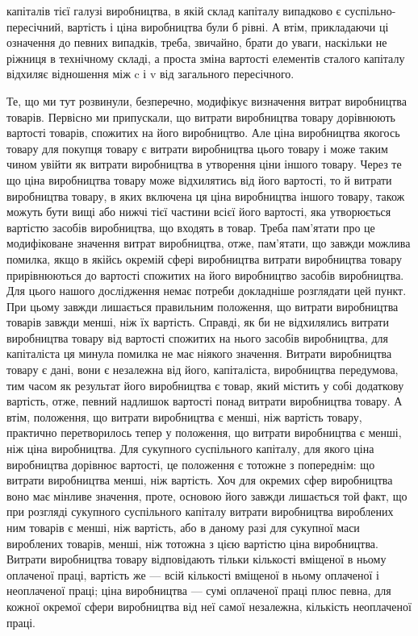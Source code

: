 капіталів тієї галузі виробництва, в якій склад капіталу випадково є суспільно-пересічний, вартість
і ціна виробництва були б
рівні. А втім, прикладаючи ці означення до певних випадків,
треба, звичайно, брати до уваги, наскільки не ріжниця в технічному складі, а проста зміна вартості
елементів сталого капіталу
відхиляє відношення між c і v від загального пересічного.

Те, що ми тут розвинули, безперечно, модифікує визначення
витрат виробництва товарів. Первісно ми припускали, що витрати виробництва товару дорівнюють
вартості товарів, спожитих на його виробництво. Але ціна виробництва якогось товару для покупця
товару є витрати виробництва цього товару
і може таким чином увійти як витрати виробництва в утворення
ціни іншого товару. Через те що ціна виробництва товару може
відхилятись від його вартості, то й витрати виробництва товару,
в яких включена ця ціна виробництва іншого товару, також
можуть бути вищі або нижчі тієї частини всієї його вартості,
яка утворюється вартістю засобів виробництва, що входять в
товар. Треба пам’ятати про це модифіковане значення витрат
виробництва, отже, пам’ятати, що завжди можлива помилка,
якщо в якійсь окремій сфері виробництва витрати виробництва товару прирівнюються до вартості
спожитих на його виробництво
засобів виробництва. Для цього нашого дослідження немає потреби докладніше розглядати цей пункт. При
цьому завжди лишається правильним положення, що витрати виробництва товарів
завжди менші, ніж їх вартість. Справді, як би не відхилялись
витрати виробництва товару від вартості спожитих на нього
засобів виробництва, для капіталіста ця минула помилка не має
ніякого значення. Витрати виробництва товару є дані, вони є
незалежна від його, капіталіста, виробництва передумова, тим часом як результат його виробництва є
товар, який містить у
собі додаткову вартість, отже, певний надлишок вартості понад
витрати виробництва товару. А втім, положення, що витрати
виробництва є менші, ніж вартість товару, практично перетворилось тепер у положення, що витрати
виробництва є менші,
ніж ціна виробництва. Для сукупного суспільного капіталу, для
якого ціна виробництва дорівнює вартості, це положення є
тотожне з попереднім: що витрати виробництва менші, ніж вартість. Хоч для окремих сфер виробництва
воно має мінливе значення, проте, основою його завжди лишається той факт, що при розгляді сукупного
суспільного капіталу витрати виробництва
вироблених ним товарів є менші, ніж вартість, або в даному разі
для сукупної маси вироблених товарів, менші, ніж тотожна з цією
вартістю ціна виробництва. Витрати виробництва товару відповідають тільки кількості вміщеної в ньому
оплаченої праці,
вартість же — всій кількості вміщеної в ньому оплаченої і неоплаченої праці; ціна виробництва — сумі
оплаченої праці плюс
певна, для кожної окремої сфери виробництва від неї самої незалежна, кількість неоплаченої праці.
